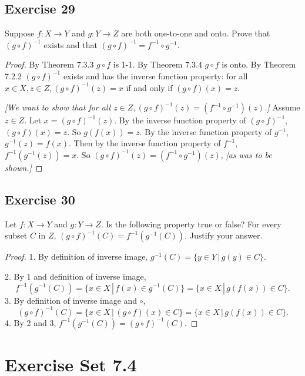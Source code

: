 \documentclass[14pt]{extarticle}
\begin{document}
\subsection{Exercise 29}
Suppose \(f: X \to Y\) and \(g: Y \to Z\) are both one-to-one and onto. Prove that \((g \circ f)^{-1}\) exists and
that \((g \circ f)^{-1} = f^{-1} \circ g^{-1}\).

\begin{proof}
    By Theorem 7.3.3 \(g \circ f\) is 1-1. By Theorem 7.3.4 \(g \circ f\) is onto. By Theorem 7.2.2 \((g \circ f)^{-1}\)
    exists and has the inverse function property: for all \(x \in X, z \in Z, (g \circ f)^{-1}(z) = x\) if and only if
    \((g \circ f)(x) = z\).

        {\it [We want to show that for all \(z \in Z, (g \circ f)^{-1}(z) = (f^{-1} \circ g^{-1})(z)\).]} Assume $z\in Z$.
    Let \(x = (g \circ f)^{-1}(z)\). By the inverse function property of \((g \circ f)^{-1}\), \((g \circ f)(x) = z\).
    So \(g(f(x)) = z\). By the inverse function property of $g^{-1}$, \(g^{-1}(z) = f(x)\). Then by the inverse
    function property of $f^{-1}$, \(f^{-1}(g^{-1}(z)) = x\).
    So \((g \circ f)^{-1}(z) = (f^{-1} \circ g^{-1})(z)\), {\it [as was to be shown.]}
\end{proof}

\subsection{Exercise 30}
Let \(f: X \to Y\) and \(g: Y \to Z\). Is the following property true or false? For every subset $C$ in $Z$,
\((g \circ f)^{-1}(C) = f^{-1}(g^{-1}(C))\). Justify your answer.

\begin{proof}
    1. By definition of inverse image, \(g^{-1}(C) = \{y \in Y \, | \, g(y) \in C\}\).

    2. By 1 and definition of inverse image,
    \[
        f^{-1}(g^{-1}(C)) = \{x \in X \, | \, f(x) \in g^{-1}(C)\} = \{x \in X \, | \, g(f(x)) \in C\}.
    \]
    3. By definition of inverse image and $\circ$,
    \[
        (g \circ f)^{-1}(C) = \{x \in X \, | \, (g \circ f)(x) \in C\} = \{x \in X \, | \, g(f(x)) \in C\}.
    \]
    4. By 2 and 3, \(f^{-1}(g^{-1}(C)) = (g \circ f)^{-1}(C)\).
\end{proof}

\section{Exercise Set 7.4}
\end{document}
